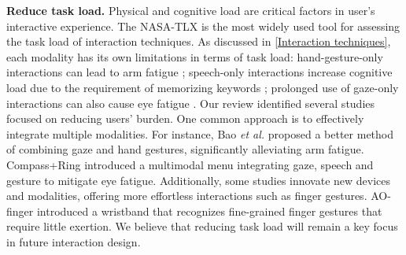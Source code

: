 \documentclass[review]{fcs}
\newcommand{\revise}[2]{\textcolor[rgb]{0,0,0}{#2}}
\begin{document}
\textbf{Reduce task load.}
Physical and cognitive load are critical factors in user’s interactive experience. The NASA-TLX is the most widely used tool for assessing the task load of interaction techniques. 
\revise{As discussed in \ref{Interaction techniques}, each modality presents its own limitations:}{As discussed in \ref{Interaction techniques}, each modality has its own limitations in terms of task load:} hand-gesture-only interactions can lead to arm fatigue \cite{DBLP:conf/vr/QuereMJWW24}; speech-only interactions increase cognitive load due to the requirement of memorizing keywords \cite{DBLP:conf/ismar/ChenGFCL23}; prolonged use of gaze-only interactions can also cause eye fatigue \cite{DBLP:conf/chi/ZhangCSS24}. Our review identified several studies focused on reducing users' burden. One common approach is to effectively integrate multiple modalities. 
\revise{For instance, Bao \textit{et al.} proposed a better method of combining gaze and hand gestures, significantly alleviating arm fatigue \cite{10108465}. Compass+Ring introduced a multimodal menu integrating gaze, speech, and gesture to mitigate eye fatigue \cite{DBLP:conf/ismar/ChenGFCL23}.}{For instance, Bao \textit{et al.} \cite{10108465} proposed a better method of combining gaze and hand gestures, significantly alleviating arm fatigue. Compass+Ring \cite{DBLP:conf/ismar/ChenGFCL23} introduced a multimodal menu integrating gaze, speech and gesture to mitigate eye fatigue.} Additionally, some studies innovate new devices and modalities, offering more effortless interactions such as finger gestures. 
\revise{AO-finger introduced a wristband that recognizes fine-grained finger gestures that require little exertion \cite{DBLP:conf/chi/XuZKN23}.}{AO-finger \cite{DBLP:conf/chi/XuZKN23} introduced a wristband that recognizes fine-grained finger gestures that require little exertion.} We believe that reducing task load will remain a key focus in future interaction design.
\end{document}
